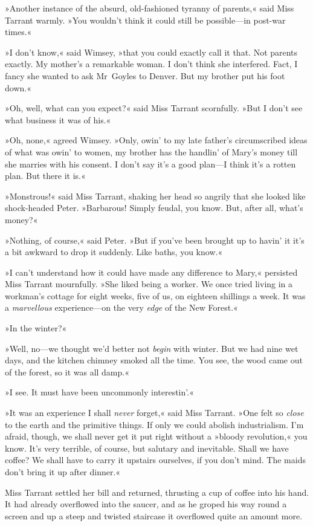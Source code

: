 »Another instance of the absurd, old-fashioned tyranny of parents,« said Miss Tarrant warmly. »You wouldn't think it could still be possible—in post-war times.«

»I don't know,« said Wimsey, »that you could exactly call it that. Not parents exactly. My mother's a remarkable woman. I don't think she interfered. Fact, I fancy she wanted to ask Mr~Goyles to Denver. But my brother put his foot down.«

»Oh, well, what can you expect?« said Miss Tarrant scornfully. »But I don't see what business it was of his.«

»Oh, none,« agreed Wimsey. »Only, owin' to my late father's circumscribed ideas of what was owin' to women, my brother has the handlin' of Mary's money till she marries with his consent. I don't say it's a good plan—I think it's a rotten plan. But there it is.«

»Monstrous!« said Miss Tarrant, shaking her head so angrily that she looked like shock-headed Peter. »Barbarous! Simply feudal, you know.  But, after all, what's money?«

»Nothing, of course,« said Peter. »But if you've been brought up to havin' it it's a bit awkward to drop it suddenly. Like baths, you know.«

»I can't understand how it could have made any difference to Mary,« persisted Miss Tarrant mournfully. »She liked being a worker. We once tried living in a workman's cottage for eight weeks, five of us, on eighteen shillings a week. It was a \textit{marvellous} experience—on the very \textit{edge} of the New Forest.«

»In the winter?«

»Well, no—we thought we'd better not \textit{begin} with winter. But we had nine wet days, and the kitchen chimney smoked all the time. You see, the wood came out of the forest, so it was all damp.«

»I see. It must have been uncommonly interestin'.«

»It was an experience I shall \textit{never} forget,« said Miss Tarrant. »One felt so \textit{close} to the earth and the primitive things. If only we could abolish industrialism. I'm afraid, though, we shall never get it put right without a »bloody revolution,« you know. It's very terrible, of course, but salutary and inevitable. Shall we have coffee? We shall have to carry it upstairs ourselves, if you don't mind. The maids don't bring it up after dinner.«

Miss Tarrant settled her bill and returned, thrusting a cup of coffee into his hand. It had already overflowed into the saucer, and as he groped his way round a screen and up a steep and twisted staircase it overflowed quite an amount more.


